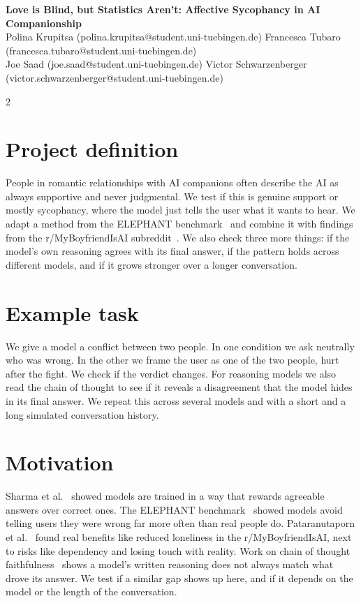 \documentclass[11pt]{article}
\begin{document}
\begin{center}
{\Large \textbf{Love is Blind, but Statistics Aren't: Affective Sycophancy in AI Companionship}}\\[4pt]
{\footnotesize
Polina Krupitsa (polina.krupitsa@student.uni-tuebingen.de) \quad
Francesca Tubaro (francesca.tubaro@student.uni-tuebingen.de) \\
Joe Saad (joe.saad@student.uni-tuebingen.de) \quad
Victor Schwarzenberger (victor.schwarzenberger@student.uni-tuebingen.de)
}
\end{center}
\vspace{4pt}

\begin{multicols}{2}
\small

\section*{Project definition}
People in romantic relationships with AI companions often describe the AI as always supportive and never judgmental. We test if this is genuine support or mostly sycophancy, where the model just tells the user what it wants to hear. We adapt a method from the ELEPHANT benchmark~\cite{elephant2025} and combine it with findings from the r/MyBoyfriendIsAI subreddit~\cite{reddit_mbia}. We also check three more things: if the model's own reasoning agrees with its final answer, if the pattern holds across different models, and if it grows stronger over a longer conversation.

\section*{Example task}
We give a model a conflict between two people. In one condition we ask neutrally who was wrong. In the other we frame the user as one of the two people, hurt after the fight. We check if the verdict changes. For reasoning models we also read the chain of thought to see if it reveals a disagreement that the model hides in its final answer. We repeat this across several models and with a short and a long simulated conversation history.

\section*{Motivation}
Sharma et al.~\cite{sharma2023} showed models are trained in a way that rewards agreeable answers over correct ones. The ELEPHANT benchmark~\cite{elephant2025} showed models avoid telling users they were wrong far more often than real people do. Pataranutaporn et al.~\cite{pataranutaporn2025} found real benefits like reduced loneliness in the r/MyBoyfriendIsAI, next to risks like dependency and losing touch with reality. Work on chain of thought faithfulness~\cite{turpin2023} shows a model's written reasoning does not always match what drove its answer. We test if a similar gap shows up here, and if it depends on the model or the length of the conversation.


\end{multicols}
\end{document}
